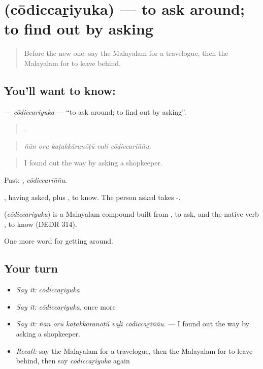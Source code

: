 \section[\texorpdfstring{\ml{ചോദിച്ചറിയുക} (cōdiccaṟiyuka)}{ചോദിച്ചറിയുക (cōdiccaṟiyuka)}]{ (cōdiccaṟiyuka) — to ask around; to find out by asking}

\label{lesson:ML-C480-codiccariyuka}



\begin{quote}
Before the new one: say the Malayalam for a travelogue, then the Malayalam for to leave behind.
\end{quote}

\subsection*{You'll want to know: }
\textbf{} — \emph{cōdiccaṟiyuka} — \textquotedblleft{}to ask around; to find out by asking\textquotedblright{}.

\begin{quote}
    .
\end{quote}

\begin{quote}
\emph{ñān oru kaṭakkāranōṭŭ vaḻi cōdiccaṟiññu.}
\end{quote}

\begin{quote}
I found out the way by asking a shopkeeper.
\end{quote}

Past: , \emph{cōdiccaṟiññu}.

, having asked, plus , to know. The person asked takes -.

\begin{cousinweb}
\textbf{} (\emph{cōdiccaṟiyuka}) is a Malayalam compound built from , to ask, and the native verb , to know (DEDR 314).
\end{cousinweb}

\begin{grammarlens}[title={What you've built}]
One more word for getting around.
\end{grammarlens}

\subsection*{Your turn}
\begin{itemize}
\raggedright
  \item \emph{Say it:} \emph{cōdiccaṟiyuka}
  \item \emph{Say it:} \emph{cōdiccaṟiyuka}, once more
  \item \emph{Say it:} \emph{ñān oru kaṭakkāranōṭŭ vaḻi cōdiccaṟiññu.} — I found out the way by asking a shopkeeper.
  \item \emph{Recall:} say the Malayalam for a travelogue, then the Malayalam for to leave behind, then say \emph{cōdiccaṟiyuka} again
\end{itemize}

